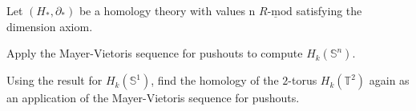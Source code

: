 \documentclass[11pt]{book}
\numberwithin{dummy}{section}
\theoremstyle{nonumberbreak}
\newenvironment{sol}[1][]{\ifthenelse{\equal{#1}{}}{\solution}{\solution[#1]}\rm}{\endsolution}
\newenvironment{prob}[1][]{\ifthenelse{\equal{#1}{}}{\problem}{\problem[#1]}\rm}{\endproblem}
\newcommand{\Rmod}{\underline{R\textrm{-}\mathrm{mod}}}
\newcommand{\Sph}{\mathbb{S}}
\begin{document}
\begin{spacing}{1.4}
\begin{prob}
\begin{sol}
\end{sol}
\end{prob}


\begin{prob} %
Let $(H_*, \partial_*)$ be a homology theory with values n $\Rmod$ satisfying the dimension axiom.
\begin{compactenum}
\item Apply the Mayer-Vietoris sequence for pushouts to compute $H_k(\Sph^n)$.
\item Using the result for $H_k(\Sph^1)$, find the homology of the $2$-torus $H_k(\mathbb{T}^2)$ again as an application of the Mayer-Vietoris sequence for pushouts.
\end{compactenum}


\begin{sol}


\end{sol}
\end{prob}
\end{spacing}
\end{document}
